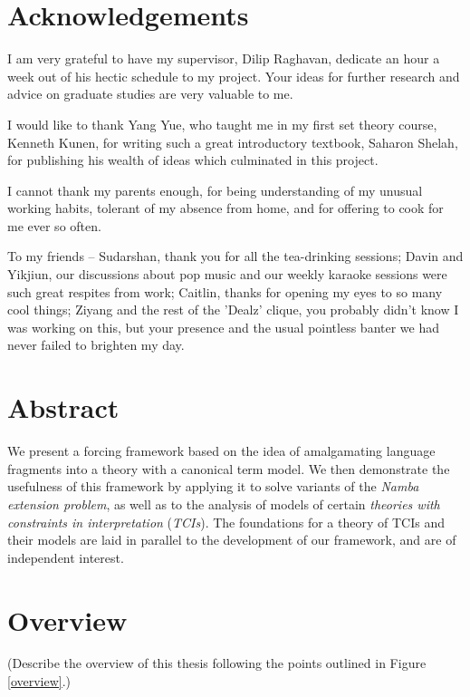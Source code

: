 \documentclass[12pt, twoside]{memoir}
\numberwithin{equation}{section}
\theoremstyle{definition}
\theoremstyle{remark}
\theoremstyle{definition}
\theoremstyle{definition}
\theoremstyle{definition}
\theoremstyle{remark}
\newcommand{\blankpage}{
\newpage
\thispagestyle{empty}
\mbox{}
\newpage
}
\begin{document}
\chapter{Acknowledgements}
\thispagestyle{simple}
I am very grateful to have my supervisor, Dilip Raghavan, dedicate an hour a week out of his hectic schedule to my project. Your ideas for further research and advice on graduate studies are very valuable to me. 
\par 
I would like to thank Yang Yue, who taught me in my first set theory course, Kenneth Kunen, for writing such a great introductory textbook, Saharon Shelah, for publishing his wealth of ideas which culminated in this project.
\par 
I cannot thank my parents enough, for being understanding of my unusual working habits, tolerant of my absence from home, and for offering to cook for me ever so often.
\par 
To my friends -- Sudarshan, thank you for all the tea-drinking sessions; Davin and Yikjiun, our discussions about pop music and our weekly karaoke sessions were such great respites from work; Caitlin, thanks for opening my eyes to so many cool things; Ziyang and the rest of the 'Dealz' clique, you probably didn't know I was working on this, but your presence and the usual pointless banter we had never failed to brighten my day.

\blankpage

\chapter{Abstract}
\thispagestyle{simple}
We present a forcing framework based on the idea of amalgamating language fragments into a theory with a canonical term model. We then demonstrate the usefulness of this framework by applying it to solve variants of the \textit{Namba extension problem}, as well as to the analysis of models of certain \emph{theories with constraints in interpretation} (\emph{TCIs}). The foundations for a theory of TCIs and their models are laid in parallel to the development of our framework, and are of independent interest.

\blankpage

\chapter{Overview}
\thispagestyle{simple}
(Describe the overview of this thesis following the points outlined in Figure \ref{overview}.)
\end{document}
